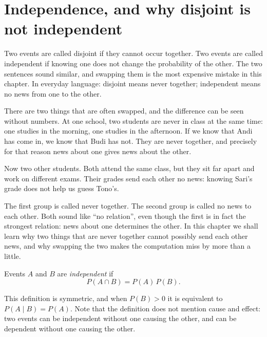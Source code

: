 \section{Independence, and why disjoint is not independent}

Two events are called disjoint if they cannot occur together. Two events are called
independent if knowing one does not change the probability of the other. The two sentences
sound similar, and swapping them is the most expensive mistake in this chapter. In everyday
language: disjoint means never together; independent means no news from one to the other.


\begin{untukanak}
There are two things that are often swapped, and the difference can be seen without numbers.
At one school, two students are never in class at the same time: one studies in the
morning, one studies in the afternoon. If we know that Andi has come in, we know that Budi
has not. They are never together, and precisely for that reason news about one gives news
about the other.

Now two other students. Both attend the same class, but they sit far apart and work on
different exams. Their grades send each other no news: knowing Sari's grade does not help
us guess Tono's.

The first group is called never together. The second group is called no news to each other.
Both sound like ``no relation'', even though the first is in fact the strongest relation:
news about one determines the other. In this chapter we shall learn why two things that are
never together cannot possibly send each other news, and why swapping the two makes the
computation miss by more than a little.
\end{untukanak}


\begin{definisi}
Events $A$ and $B$ are \emph{independent} if
\[
P(A\cap B)=P(A)\,P(B).
\]
\end{definisi}

This definition is symmetric, and when $P(B)>0$ it is equivalent to $P(A\mid B)=P(A)$. Note
that the definition does not mention cause and effect: two events can be independent
without one causing the other, and can be dependent without one causing the other.


